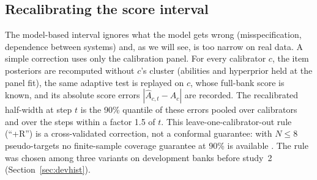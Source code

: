 \subsection{Recalibrating the score interval}
The model-based interval ignores what the model gets wrong (misspecification,
dependence between systems) and, as we will see, is too narrow on real data. A simple
correction uses only the calibration panel. For every calibrator $c$, the item posteriors
are recomputed without $c$'s cluster (abilities and hyperprior held at the panel fit), the
same adaptive test is replayed on $c$, whose full-bank score is known, and its absolute
score errors $|\hat A_{c,t}-A_c|$ are recorded. The recalibrated half-width at step $t$ is
the 90\% quantile of these errors pooled over calibrators and over the steps within a
factor 1.5 of $t$. This leave-one-calibrator-out rule (``+R'') is a cross-validated
correction, not a conformal guarantee: with $N\le8$ pseudo-targets no finite-sample
coverage guarantee at 90\% is available \citep{vovk2005algorithmic}. The rule was chosen
among three variants on development banks before study~2 (Section~\ref{sec:devhist}).

